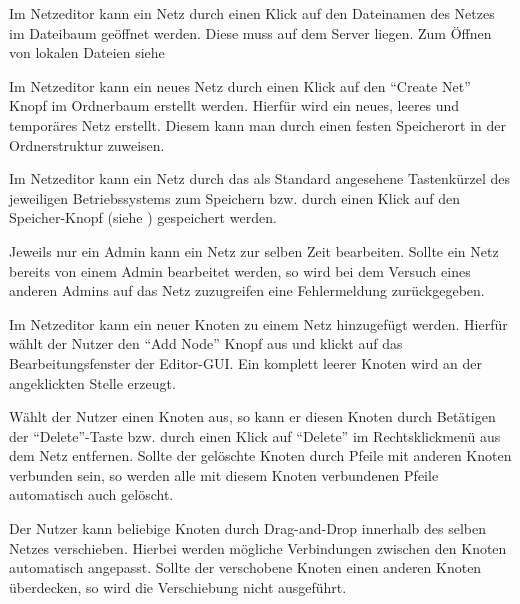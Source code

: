 \documentclass[parskip=full,11pt,twoside]{scrartcl}
\begin{document}
Im Netzeditor kann ein Netz durch einen Klick auf den Dateinamen des Netzes im Dateibaum geöffnet werden. Diese muss auf dem Server liegen. Zum Öffnen von lokalen Dateien siehe %

Im Netzeditor kann ein neues Netz durch einen Klick auf den \enquote{Create Net} Knopf im Ordnerbaum erstellt werden. Hierfür wird ein neues, leeres  und temporäres Netz erstellt. Diesem kann man durch %
einen festen Speicherort in der Ordnerstruktur zuweisen.

Im Netzeditor kann ein Netz durch das als Standard angesehene Tastenkürzel des jeweiligen Betriebssystems zum Speichern bzw. durch einen Klick auf den Speicher-Knopf (siehe ) gespeichert werden.

Jeweils nur ein Admin kann ein Netz zur selben Zeit bearbeiten. Sollte ein Netz bereits von einem Admin bearbeitet werden, so wird bei dem Versuch eines anderen Admins auf das Netz zuzugreifen eine Fehlermeldung zurückgegeben.

Im Netzeditor kann ein neuer Knoten zu einem Netz hinzugefügt werden. Hierfür wählt der Nutzer den \enquote{Add Node} Knopf aus und klickt auf das Bearbeitungsfenster der Editor-GUI. Ein komplett leerer Knoten wird an der angeklickten Stelle erzeugt.

Wählt der Nutzer einen Knoten aus, so kann er diesen Knoten durch Betätigen der \enquote{Delete}-Taste bzw. durch einen Klick auf \enquote{Delete} im Rechtsklickmenü aus dem Netz entfernen. Sollte der gelöschte Knoten durch Pfeile mit anderen Knoten verbunden sein, so werden alle mit diesem Knoten verbundenen Pfeile automatisch auch gelöscht.

Der Nutzer kann beliebige Knoten durch Drag-and-Drop innerhalb des selben Netzes verschieben. Hierbei werden mögliche Verbindungen zwischen den Knoten automatisch angepasst. Sollte der verschobene Knoten einen anderen Knoten überdecken, so wird die Verschiebung nicht ausgeführt. %
\end{document}
